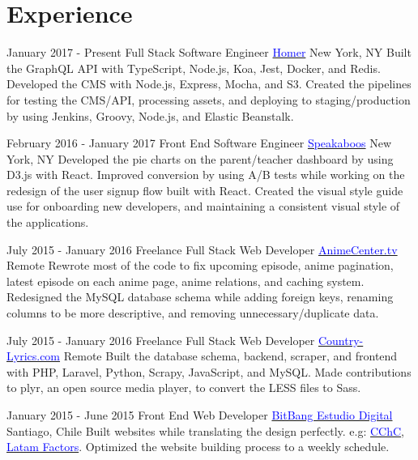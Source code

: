 \documentclass[11pt,a4paper,sans]{moderncv}        %
\begin{document}
\makecvtitle

\section{Experience}

\cventry
  {January 2017 - Present}
  {Full Stack Software Engineer}
  {\textmd{\href{https://learnwithhomer.com}{\textcolor{blue}{Homer}}}}
  {\textmd{New York, NY}}{}
  {
    Built the GraphQL API with TypeScript, Node.js, Koa, Jest, Docker, and Redis.
    Developed the CMS with Node.js, Express, Mocha, and S3.
    Created the pipelines for testing the CMS/API, processing assets, and deploying to staging/production by using Jenkins, Groovy, Node.js, and Elastic Beanstalk.
  }

\cventry
  {February 2016 - January 2017}
  {Front End Software Engineer}
  {\textmd{\href{https://www.speakaboos.com}{\textcolor{blue}{Speakaboos}}}}
  {\textmd{New York, NY}}{}
  {
    Developed the pie charts on the parent/teacher dashboard by using D3.js with React.
    Improved conversion by using A/B tests while working on the redesign of the user signup flow built with React.
    Created the visual style guide use for onboarding new developers, and maintaining a consistent visual style of the applications.
  }

\cventry
  {July 2015 - January 2016}
  {Freelance Full Stack Web Developer}
  {\textmd{\href{http://animecenter.tv}{\textcolor{blue}{AnimeCenter.tv}}}}
  {\textmd{Remote}}{}
  {
    Rewrote most of the code to fix upcoming episode, anime pagination, latest episode on each anime page, anime relations, and caching system.
    Redesigned the MySQL database schema while adding foreign keys, renaming columns to be more descriptive, and removing unnecessary/duplicate data.
  }

\cventry
  {July 2015 - January 2016}
  {Freelance Full Stack Web Developer}
  {\textmd{\href{https://www.country-lyrics.com}{\textcolor{blue}{Country-Lyrics.com}}}}
  {\textmd{Remote}}{}
  {
    Built the database schema, backend, scraper, and frontend with PHP, Laravel, Python, Scrapy, JavaScript, and MySQL.
    Made contributions to plyr, an open source media player, to convert the LESS files to Sass.
  }

\cventry
  {January 2015 - June 2015}
  {Front End Web Developer}
  {\textmd{\href{http://bitbang.cl}{\textcolor{blue}{BitBang Estudio Digital}}}}
  {\textmd{Santiago, Chile}}{}
  {
    Built websites while translating the design perfectly. e.g: \textmd{\href{http://www.cchc.cl}{\textcolor{blue}{CChC}}}, \textmd{\href{http://www.latamfactors.cl}{\textcolor{blue}{Latam Factors}}}.
    Optimized the website building process to a weekly schedule.
  }
\end{document}
